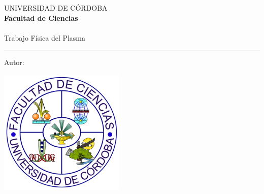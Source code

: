 \AddToShipoutPicture*{\BackgroundPic}
\begin{titlepage}
\begin{center}
\Large UNIVERSIDAD DE CÓRDOBA\\[0.5 cm]
\large  \textbf{Facultad de Ciencias}\\[1.25 cm]
\large \textbf{\titulacion}\\[1.25 cm]
\Large  Trabajo Física del Plasma\\[2.25 cm]
\Huge   \titulo
\end{center}
\vspace{1.25cm}
{\color{blue}\hrule}
\vspace{0.5cm}
\noindent \Large{Autor: \autor}
\vfill
\begin{center}
 \includegraphics[width=6cm]{img/logo_ciencias.png} 
\end{center}
\vfill
\rightline{\fecha}
\end{titlepage}
\renewcommand{\baselinestretch}{0.9}
\ClearShipoutPicture